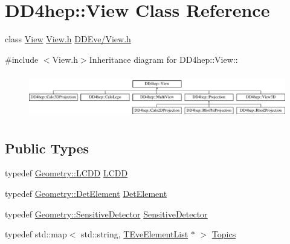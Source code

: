 \hypertarget{class_d_d4hep_1_1_view}{
\section{DD4hep::View Class Reference}
\label{class_d_d4hep_1_1_view}
}


class \hyperlink{class_d_d4hep_1_1_view}{View} \hyperlink{_view_8h}{View.h} \hyperlink{_view_8h}{DDEve/View.h}  


{\ttfamily \#include $<$View.h$>$}Inheritance diagram for DD4hep::View::\begin{figure}[H]
\begin{center}
\leavevmode
\includegraphics[height=1.96491cm]{class_d_d4hep_1_1_view}
\end{center}
\end{figure}
\subsection*{Public Types}
\begin{DoxyCompactItemize}
\item 
typedef \hyperlink{class_d_d4hep_1_1_geometry_1_1_l_c_d_d}{Geometry::LCDD} \hyperlink{class_d_d4hep_1_1_view_ac08032a73da302ae36cd3c7b07b83864}{LCDD}
\item 
typedef \hyperlink{class_d_d4hep_1_1_geometry_1_1_det_element}{Geometry::DetElement} \hyperlink{class_d_d4hep_1_1_view_a59eafc8150df21b918b964850ac6c462}{DetElement}
\item 
typedef \hyperlink{class_d_d4hep_1_1_geometry_1_1_sensitive_detector}{Geometry::SensitiveDetector} \hyperlink{class_d_d4hep_1_1_view_ad8426310f6488c879c008001eb20289e}{SensitiveDetector}
\item 
typedef std::map$<$ std::string, \hyperlink{class_t_eve_element_list}{TEveElementList} $\ast$ $>$ \hyperlink{class_d_d4hep_1_1_view_aac8510a8567e5e9128020fd81d8f57de}{Topics}
\end{DoxyCompactItemize}
